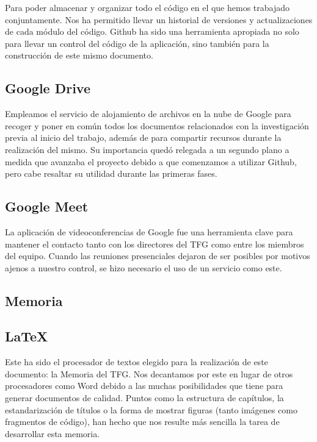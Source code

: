 Para poder almacenar y organizar todo el código en el que hemos trabajado conjuntamente. Nos ha permitido llevar un historial de versiones y actualizaciones de cada módulo del código. Github ha sido una herramienta apropiada no solo para llevar un control del código de la aplicación, sino también para la construcción de este mismo documento.

\subsection*{Google Drive}

Empleamos el servicio de alojamiento de archivos en la nube de Google para recoger y poner en común todos los documentos relacionados con la investigación previa al inicio del trabajo, además de para compartir recursos durante la realización del mismo. Su importancia quedó relegada a un segundo plano a medida que avanzaba el proyecto debido a que comenzamos a utilizar Github, pero cabe resaltar su utilidad durante las primeras fases.

\subsection*{Google Meet}

La aplicación de videoconferencias de Google fue una herramienta clave para mantener el contacto tanto con los directores del TFG como entre los miembros del equipo. Cuando las reuniones presenciales dejaron de ser posibles por motivos ajenos a nuestro control, se hizo necesario el uso de un servicio como este.

\subsection{Memoria}

\subsection*{LaTeX}

Este ha sido el procesador de textos elegido para la realización de este documento: la Memoria del TFG. Nos decantamos por este en lugar de otros procesadores como Word debido a las muchas posibilidades que tiene para generar documentos de calidad. Puntos como la estructura de capítulos, la estandarización de títulos o la forma de mostrar figuras (tanto imágenes como fragmentos de código), han hecho que nos resulte más sencilla la tarea de desarrollar esta memoria.


